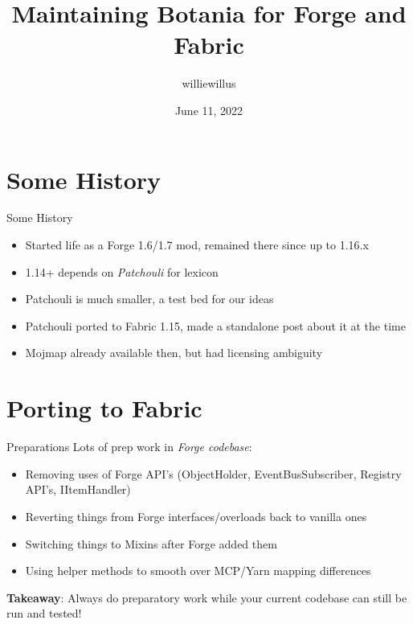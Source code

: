 \documentclass{beamer}
\title{Maintaining Botania for Forge and Fabric}
\date{June 11, 2022}
\author{williewillus}
\institute{Violet Moon Modding}
\begin{document}
\maketitle

\section{Some History}
\begin{frame}{Some History}
  \begin{itemize}
  \item Started life as a Forge 1.6/1.7 mod, remained there since up to 1.16.x
  \item 1.14+ depends on \textit{Patchouli} for lexicon
  \item Patchouli is much smaller, a test bed for our ideas
  \item Patchouli ported to Fabric 1.15, made a standalone post about it at the time
  \item Mojmap already available then, but had licensing ambiguity
  \end{itemize}
\end{frame}

\section{Porting to Fabric}
\begin{frame}{Preparations}
  Lots of prep work in \textit{Forge codebase}:
  \begin{itemize}
  \item Removing uses of Forge API's (ObjectHolder, EventBusSubscriber, Registry API's, IItemHandler)
  \item Reverting things from Forge interfaces/overloads back to vanilla ones
  \item Switching things to Mixins after Forge added them
  \item Using helper methods to smooth over MCP/Yarn mapping differences
  \end{itemize}

  \textbf{Takeaway}: Always do preparatory work while your current codebase can still be
  run and tested!
\end{frame}
\end{document}
